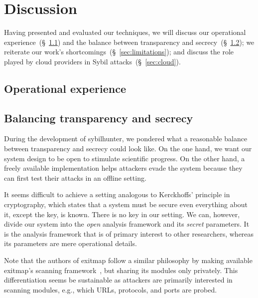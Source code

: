 \section{Discussion}
\label{sec:discussion}
Having presented and evaluated our techniques, we will discuss our operational
experience~(\S~\ref{sec:operational}) and the balance between transparency and
secrecy~(\S~\ref{sec:secrecy}); we reiterate our work's
shortcomings~(\S~\ref{sec:limitations}); and discuss the role played by cloud
providers in Sybil attacks~(\S~\ref{sec:cloud}).

\subsection{Operational experience}
\label{sec:operational}



\subsection{Balancing transparency and secrecy}
\label{sec:secrecy}
During the development of sybilhunter, we pondered what a reasonable balance
between transparency and secrecy could look like.  On the one hand, we want our
system design to be open to stimulate scientific progress.  On the other hand,
a freely available implementation helps attackers evade the system because they
can first test their attacks in an offline setting.

It seems difficult to achieve a setting analogous to Kerckhoffs' principle in
cryptography, which states that a system must be secure even everything about
it, except the key, is known.  There is no key in our setting.  We can, however,
divide our system into the \emph{open} analysis framework and its \emph{secret}
parameters.  It is the analysis framework that is of primary interest to other
researchers, whereas its parameters are mere operational details.

Note that the authors of exitmap follow a similar philosophy by making available
exitmap's scanning framework~\cite{exitmap}, but sharing its modules only
privately.  This differentiation seems be sustainable as attackers are primarily
interested in scanning modules, e.g., which URLs, protocols, and ports are
probed.

